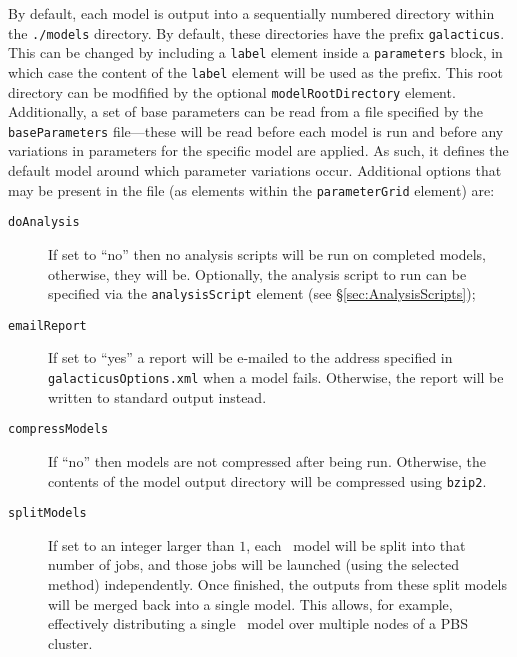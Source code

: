 By default, each model is output into a sequentially numbered directory within the {\tt ./models} directory. By default, these directories have the prefix {\tt galacticus}. This can be changed by including a {\tt label} element inside a {\tt parameters} block, in which case the content of the {\tt label} element will be used as the prefix. This root directory can be modfified by the optional {\tt modelRootDirectory} element. Additionally, a set of base parameters can be read from a file specified by the {\tt baseParameters} file---these will be read before each model is run and before any variations in parameters for the specific model are applied. As such, it defines the default model around which parameter variations occur. Additional options that may be present in the file (as elements within the {\tt parameterGrid} element) are:
\begin{description}
\item[{\tt doAnalysis}]If set to ``no'' then no analysis scripts will be run on completed models, otherwise, they will be. Optionally, the analysis script to run can be specified via the {\tt analysisScript} element (see \S\ref{sec:AnalysisScripts});
\item[{\tt emailReport}] If set to ``yes'' a report will be e-mailed to the address specified in {\tt galacticusOptions.xml} when a model fails. Otherwise, the report will be written to standard output instead.
\item[{\tt compressModels}] If ``no'' then models are not compressed after being run. Otherwise, the contents of the model output directory will be compressed using {\tt bzip2}.
\item[{\tt splitModels}] If set to an integer larger than $1$, each \glc\ model will be split into that number of jobs, and those jobs will be launched (using the selected method) independently. Once finished, the outputs from these split models will be merged back into a single model. This allows, for example, effectively distributing a single \glc\ model over multiple nodes of a PBS cluster.
\end{description}

